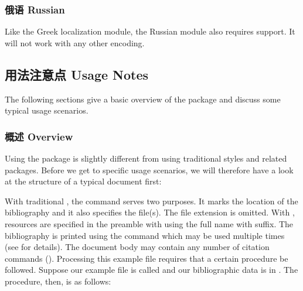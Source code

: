 \subsubsection{俄语 Russian}
\label{use:loc:rus}

Like the Greek localization module, the Russian module also requires \utf support. It will not work with any other encoding.

\subsection{用法注意点 Usage Notes}
\label{use:use}

The following sections give a basic overview of the \biblatex package and discuss some typical usage scenarios.

\subsubsection{概述 Overview}
\label{use:use:int}

Using the \biblatex package is slightly different from using traditional \bibtex styles and related packages. Before we get to specific usage scenarios, we will therefore have a look at the structure of a typical document first:

%
With traditional \bibtex, the  command serves two purposes. It marks the location of the bibliography and it also specifies the  file(s). The file extension is omitted. With \biblatex, resources are specified in the preamble with   using the full name with  suffix. The bibliography is printed using the  command which may be used multiple times (see  for details). The document body may contain any number of citation commands (). Processing this example file requires that a certain procedure be followed. Suppose our example file is called  and our bibliographic data is in . The procedure, then, is as follows:

\paragraph{\biber}

